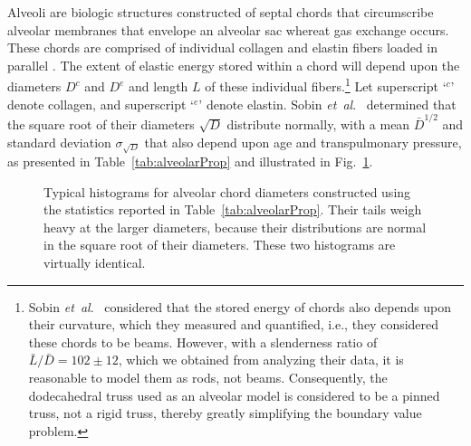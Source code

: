 Alveoli are biologic structures constructed of septal chords that circumscribe alveolar membranes that envelope an alveolar sac whereat gas exchange occurs.  These chords are comprised of individual collagen and elastin fibers loaded in parallel \cite{Matsudaetal87,Sobinetal88}.  The extent of elastic energy stored within a chord will depend upon the diameters $D^c$ and $D^e$ and length $L$ of these individual fibers.\footnote{
	Sobin \textit{et~al}.\ \cite{Sobinetal88} considered that the stored energy of chords also depends upon their curvature, which they measured and quantified, i.e., they considered these chords to be beams.  However, with a slenderness ratio of $\bar{L}/\bar{D} = 102 \pm 12$, which we obtained from analyzing their data, it is reasonable to model them as rods, not beams.  Consequently, the dodecahedral truss used as an alveolar model is considered to be a pinned truss, not a rigid truss, thereby greatly simplifying the boundary value problem.
}
Let superscript `$\mbox{}^c$' denote collagen, and superscript `$\mbox{}^e$' denote elastin.  Sobin \textit{et~al}.\ \cite{Sobinetal88} determined that the square root of their diameters $\sqrt{D}$ distribute normally, with a mean $\bar{D}^{1/2}$ and standard deviation $\sigma_{\sqrt{D}}$ that also depend upon age and transpulmonary pressure, as presented in Table~\ref{tab:alveolarProp} and illustrated in Fig.~\ref{fig:septalChordStats}. 

\begin{figure}
    \centering
    \hfill
    \caption{Typical histograms for alveolar chord diameters constructed using the statistics reported in Table~\ref{tab:alveolarProp}.  Their tails weigh heavy at the larger diameters, because their distributions are normal in the square root of their diameters.  These two histograms are virtually identical.}
    \label{fig:septalChordStats}
\end{figure}

